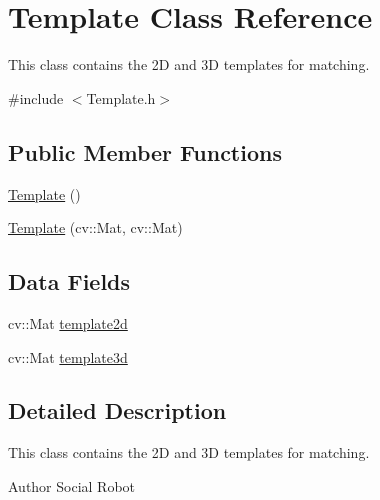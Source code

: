 \hypertarget{classTemplate}{
\section{Template Class Reference}
\label{classTemplate}
}


This class contains the 2D and 3D templates for matching.  




{\ttfamily \#include $<$Template.h$>$}

\subsection*{Public Member Functions}
\begin{DoxyCompactItemize}
\item 
\hyperlink{classTemplate_afea5166b9ca0022fe21c2ed4882c161a}{Template} ()
\item 
\hyperlink{classTemplate_a9234aea5815f2a8d8bde56f635b2d2f3}{Template} (cv::Mat, cv::Mat)
\end{DoxyCompactItemize}
\subsection*{Data Fields}
\begin{DoxyCompactItemize}
\item 
cv::Mat \hyperlink{classTemplate_a65d3e446fb6ac165be19da2d747e85ed}{template2d}
\item 
cv::Mat \hyperlink{classTemplate_a27b16dc049359b1ac3ee24b08841ba56}{template3d}
\end{DoxyCompactItemize}


\subsection{Detailed Description}
This class contains the 2D and 3D templates for matching. \begin{DoxyAuthor}{Author}
Social Robot 
\end{DoxyAuthor}


